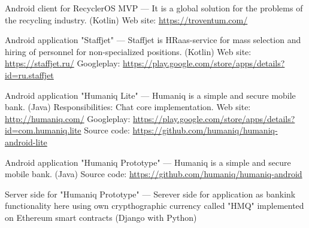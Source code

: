 \begin{cventries}
{\begin{cvitems}
    \item {
        \begin{flushleft}
            Android client for RecyclerOS MVP — It is a global solution for the problems of the recycling industry. (Kotlin)\linebreak
            Web site: \url{https://troventum.com/}\linebreak
        \end{flushleft}
    }
    \item {
        \begin{flushleft}
            Android application "Staffjet" --- Staffjet is HRaas-service for mass selection and hiring of personnel for non-specialized positions. (Kotlin)\linebreak
            Web site: \url{https://staffjet.ru/}\linebreak
            Googleplay: \url{https://play.google.com/store/apps/details?id=ru.staffjet}\linebreak
        \end{flushleft}
    }
    \item {
        \begin{flushleft}
            Android application "Humaniq Lite" --- Humaniq is a simple and secure mobile bank. (Java)\linebreak
            Responsibilities: Chat core implementation.\linebreak
            Web site: \url{http://humaniq.com/}\linebreak
            Googleplay: \url{https://play.google.com/store/apps/details?id=com.humaniq.lite}\linebreak
            Source code: \url{https://github.com/humaniq/humaniq-android-lite}\linebreak
        \end{flushleft}
    }
    \item {
        \begin{flushleft}
            Android application "Humaniq Prototype" --- Humaniq is a simple and secure mobile bank. (Java)\linebreak
            Source code: \url{https://github.com/humaniq/humaniq-android}\linebreak
        \end{flushleft}
    }
    \item {
        \begin{flushleft}
            Server side for "Humaniq Prototype" ---
            Serever side for application as bankink functionality here using own crypthographic currency called "HMQ" implemented on Ethereum smart contracts (Django with Python)\linebreak

\end{flushleft}}
\end{cvitems}}
\end{cventries}
